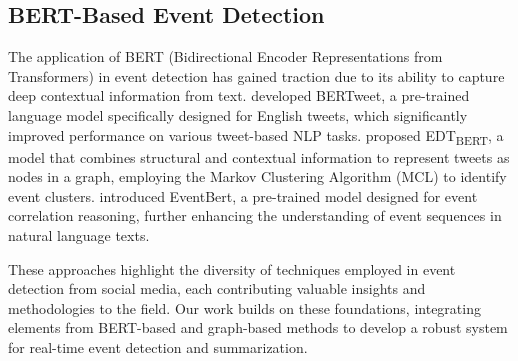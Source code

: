 \subsection{BERT-Based Event Detection}
\label{sec:bertbased}
The application of BERT (Bidirectional Encoder Representations from Transformers) \cite{bert} in event detection has gained traction due to its ability to capture deep contextual information from text. \citet{bertweet} developed BERTweet, a pre-trained language model specifically designed for English tweets, which significantly improved performance on various tweet-based NLP tasks.  \citet{edtbert} proposed EDT\textsubscript{BERT}, a model that combines structural and contextual information to represent tweets as nodes in a graph, employing the Markov Clustering Algorithm (MCL) \cite{mcl} to identify event clusters. \citet{eventbert} introduced EventBert, a pre-trained model designed for event correlation reasoning, further enhancing the understanding of event sequences in natural language texts.


These approaches highlight the diversity of techniques employed in event detection from social media, each contributing valuable insights and methodologies to the field. Our work builds on these foundations, integrating elements from BERT-based and graph-based methods to develop a robust system for real-time event detection and summarization.
